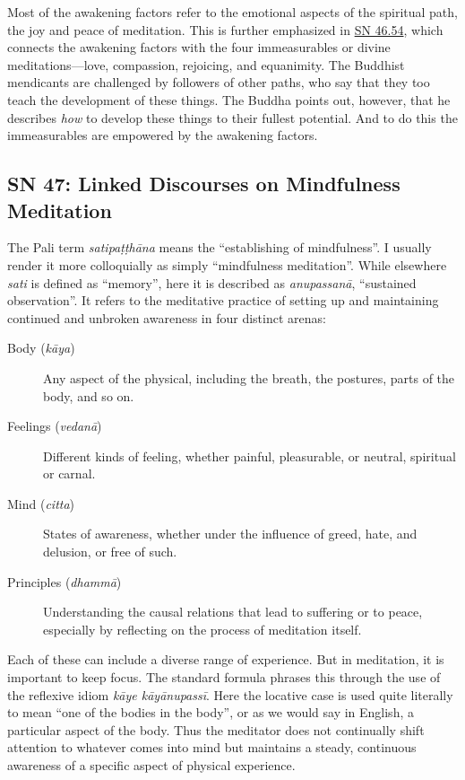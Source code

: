 \documentclass[12pt,openany]{book}%
\begin{document}
Most of the awakening factors refer to the emotional aspects of the spiritual path, the joy and peace of meditation. This is further emphasized in \href{https://suttacentral.net/sn46.54}{SN 46.54}, which connects the awakening factors with the four immeasurables or divine meditations—love, compassion, rejoicing, and equanimity. The Buddhist mendicants are challenged by followers of other paths, who say that they too teach the development of these things. The Buddha points out, however, that he describes \emph{how} to develop these things to their fullest potential. And to do this the immeasurables are empowered by the awakening factors.

\subsection*{SN 47: Linked Discourses on Mindfulness Meditation}

The Pali term \textit{\textsanskrit{satipaṭṭhāna}} means the “establishing of mindfulness”. I usually render it more colloquially as simply “mindfulness meditation”. While elsewhere \textit{sati} is defined as “memory”, here it is described as \textit{\textsanskrit{anupassanā}}, “sustained observation”. It refers to the meditative practice of setting up and maintaining continued and unbroken awareness in four distinct arenas:

\begin{description}%
\item[Body (\textit{\textsanskrit{kāya}})] Any aspect of the physical, including the breath, the postures, parts of the body, and so on.%
\item[Feelings (\textit{\textsanskrit{vedanā}})] Different kinds of feeling, whether painful, pleasurable, or neutral, spiritual or carnal.%
\item[Mind (\textit{citta})] States of awareness, whether under the influence of greed, hate, and delusion, or free of such.%
\item[Principles (\textit{\textsanskrit{dhammā}})] Understanding the causal relations that lead to suffering or to peace, especially by reflecting on the process of meditation itself.%
\end{description}

Each of these can include a diverse range of experience. But in meditation, it is important to keep focus. The standard formula phrases this through the use of the reflexive idiom \textit{\textsanskrit{kāye} \textsanskrit{kāyānupassī}}. Here the locative case is used quite literally to mean “one of the bodies in the body”, or as we would say in English, a particular aspect of the body. Thus the meditator does not continually shift attention to whatever comes into mind but maintains a steady, continuous awareness of a specific aspect of physical experience.
\end{document}
